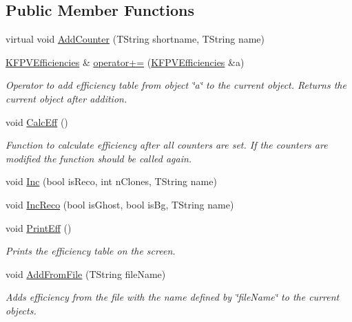 \subsection*{Public Member Functions}
\begin{DoxyCompactItemize}
\item 
virtual void \hyperlink{classKFPVEfficiencies_a6c8fe247dd32832b70f999da9620acb1}{Add\+Counter} (T\+String shortname, T\+String name)
\item 
\hyperlink{classKFPVEfficiencies}{K\+F\+P\+V\+Efficiencies} \& \hyperlink{classKFPVEfficiencies_ae3bf5a78152a2647602e4e8fc208e0cc}{operator+=} (\hyperlink{classKFPVEfficiencies}{K\+F\+P\+V\+Efficiencies} \&a)\hypertarget{classKFPVEfficiencies_ae3bf5a78152a2647602e4e8fc208e0cc}{}\label{classKFPVEfficiencies_ae3bf5a78152a2647602e4e8fc208e0cc}

\begin{DoxyCompactList}\small\item\em Operator to add efficiency table from object \char`\"{}a\char`\"{} to the current object. Returns the current object after addition. \end{DoxyCompactList}\item 
void \hyperlink{classKFPVEfficiencies_a70b97a29c9f82ee37c878727e8329984}{Calc\+Eff} ()\hypertarget{classKFPVEfficiencies_a70b97a29c9f82ee37c878727e8329984}{}\label{classKFPVEfficiencies_a70b97a29c9f82ee37c878727e8329984}

\begin{DoxyCompactList}\small\item\em Function to calculate efficiency after all counters are set. If the counters are modified the function should be called again. \end{DoxyCompactList}\item 
void \hyperlink{classKFPVEfficiencies_a331cde519b6ab92fbad094aeb682863b}{Inc} (bool is\+Reco, int n\+Clones, T\+String name)
\item 
void \hyperlink{classKFPVEfficiencies_aea0df6884f262e4dfebe3d07eb4c9b2e}{Inc\+Reco} (bool is\+Ghost, bool is\+Bg, T\+String name)
\item 
void \hyperlink{classKFPVEfficiencies_a0a56a067fb05669bdf7a74c8debbe0f7}{Print\+Eff} ()\hypertarget{classKFPVEfficiencies_a0a56a067fb05669bdf7a74c8debbe0f7}{}\label{classKFPVEfficiencies_a0a56a067fb05669bdf7a74c8debbe0f7}

\begin{DoxyCompactList}\small\item\em Prints the efficiency table on the screen. \end{DoxyCompactList}\item 
void \hyperlink{classKFPVEfficiencies_a70663999ca44fa5be5e92892940d2595}{Add\+From\+File} (T\+String file\+Name)\hypertarget{classKFPVEfficiencies_a70663999ca44fa5be5e92892940d2595}{}\label{classKFPVEfficiencies_a70663999ca44fa5be5e92892940d2595}

\begin{DoxyCompactList}\small\item\em Adds efficiency from the file with the name defined by \char`\"{}file\+Name\char`\"{} to the current objects. \end{DoxyCompactList}\end{DoxyCompactItemize}
